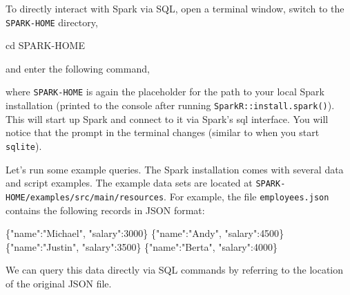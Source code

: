 \documentclass[
  12pt,
]{style/krantz}
\newenvironment{Shaded}{\begin{snugshade}}{\end{snugshade}}
\newcommand{\BuiltInTok}[1]{#1}
\newcommand{\DataTypeTok}[1]{\textcolor[rgb]{0.13,0.29,0.53}{#1}}
\newcommand{\DecValTok}[1]{\textcolor[rgb]{0.00,0.00,0.81}{#1}}
\newcommand{\ExtensionTok}[1]{#1}
\newcommand{\FunctionTok}[1]{\textcolor[rgb]{0.00,0.00,0.00}{#1}}
\newcommand{\NormalTok}[1]{#1}
\newcommand{\StringTok}[1]{\textcolor[rgb]{0.31,0.60,0.02}{#1}}
\begin{document}
To directly interact with Spark via SQL, open a terminal window, switch to the \texttt{SPARK-HOME} directory,

\begin{Shaded}
\begin{Highlighting}[]
\BuiltInTok{cd}\NormalTok{ SPARK{-}HOME}
\end{Highlighting}
\end{Shaded}

and enter the following command,

\begin{Shaded}
\end{Shaded}

where \texttt{SPARK-HOME} is again the placeholder for the path to your local Spark installation (printed to the console after running \texttt{SparkR::install.spark()}). This will start up Spark and connect to it via Spark's sql interface. You will notice that the prompt in the terminal changes (similar to when you start \texttt{sqlite}).

Let's run some example queries. The Spark installation comes with several data and script examples. The example data sets are located at \texttt{SPARK-HOME/examples/src/main/resources}. For example, the file \texttt{employees.json} contains the following records in JSON format:

\begin{Shaded}
\begin{Highlighting}[]
\FunctionTok{\{}\DataTypeTok{"name"}\FunctionTok{:}\StringTok{"Michael"}\FunctionTok{,} \DataTypeTok{"salary"}\FunctionTok{:}\DecValTok{3000}\FunctionTok{\}}
\FunctionTok{\{}\DataTypeTok{"name"}\FunctionTok{:}\StringTok{"Andy"}\FunctionTok{,} \DataTypeTok{"salary"}\FunctionTok{:}\DecValTok{4500}\FunctionTok{\}}
\FunctionTok{\{}\DataTypeTok{"name"}\FunctionTok{:}\StringTok{"Justin"}\FunctionTok{,} \DataTypeTok{"salary"}\FunctionTok{:}\DecValTok{3500}\FunctionTok{\}}
\FunctionTok{\{}\DataTypeTok{"name"}\FunctionTok{:}\StringTok{"Berta"}\FunctionTok{,} \DataTypeTok{"salary"}\FunctionTok{:}\DecValTok{4000}\FunctionTok{\}}
\end{Highlighting}
\end{Shaded}

We can query this data directly via SQL commands by referring to the location of the original JSON file.
\end{document}
